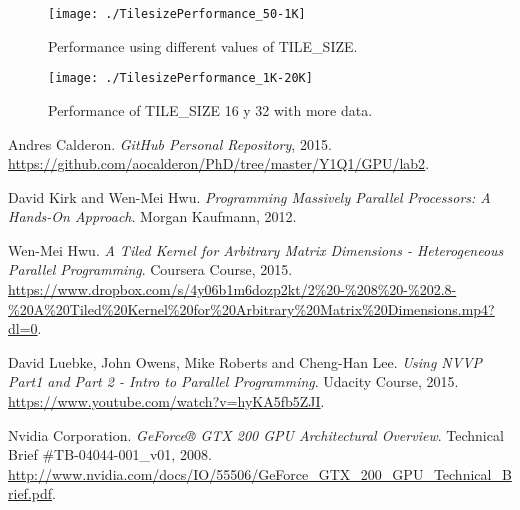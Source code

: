 \documentclass[a4paper,10pt]{scrartcl}
\begin{document}
\begin{enumerate}
 \begin{figure}
 \centering
 \texttt{[image: ./TilesizePerformance\_50-1K]}
 \caption{Performance using different values of TILE\_SIZE.}\label{fig:TilesizePerformance_50-1K}
 \end{figure}

 \begin{figure}
 \centering
 \texttt{[image: ./TilesizePerformance\_1K-20K]}
 \caption{Performance of TILE\_SIZE 16 y 32 with more data.}\label{fig:TilesizePerformance_1K-20K}
 \end{figure}
 
\end{enumerate}

\begin{thebibliography}{9}
Andres Calderon.
\textit{GitHub Personal Repository}, 2015. 
\url{https://github.com/aocalderon/PhD/tree/master/Y1Q1/GPU/lab2}.
 
David Kirk and Wen-Mei Hwu.
\textit{Programming Massively Parallel Processors: A Hands-On Approach}. 
Morgan Kaufmann, 2012.

Wen-Mei Hwu.
\textit{A Tiled Kernel for Arbitrary Matrix Dimensions - Heterogeneous Parallel Programming}. 
Coursera Course, 2015. \url{https://www.dropbox.com/s/4y06b1m6dozp2kt/2%20-%208%20-%202.8-%20A%20Tiled%20Kernel%20for%20Arbitrary%20Matrix%20Dimensions.mp4?dl=0}.

David Luebke, John Owens, Mike Roberts and Cheng-Han Lee.
\textit{Using NVVP Part1 and Part 2 - Intro to Parallel Programming}. 
Udacity Course, 2015. \url{https://www.youtube.com/watch?v=hyKA5fb5ZJI}.

Nvidia Corporation.
\textit{GeForce® GTX 200 GPU Architectural Overview}. Technical Brief \#TB-04044-001\_v01, 2008. 
\url{http://www.nvidia.com/docs/IO/55506/GeForce_GTX_200_GPU_Technical_Brief.pdf}.
\end{thebibliography}
\end{document}

